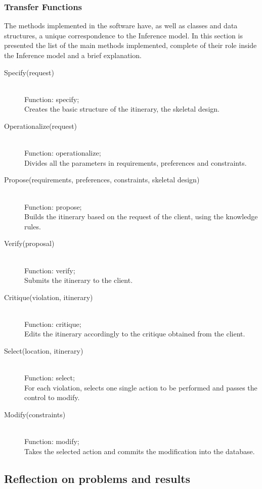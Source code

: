 \documentclass[11pt]{article} %
\begin{document}
\subsubsection{Transfer Functions}
The methods implemented in the software have, as well as classes and data structures, a unique correspondence to the Inference model. In this section is presented the list of the main methods implemented, complete of their role inside the Inference model and a brief explanation.
\begin{description}
\item[Specify(request)] \hfill \\
Function: specify;\\
Creates the basic structure of the itinerary, the skeletal design.
\item[Operationalize(request)] \hfill \\
Function: operationalize;\\
Divides all the parameters in requirements, preferences and constraints.
\item[Propose(requirements, preferences, constraints, skeletal design)] \hfill \\
Function: propose;\\
Builds the itinerary based on the request of the client, using the knowledge rules.
\item[Verify(proposal)] \hfill \\
Function: verify; \\
Submits the itinerary to the client.
\item[Critique(violation, itinerary)] \hfill \\
Function: critique;\\
Edits the itinerary accordingly to the critique obtained from the client.
\item[Select(location, itinerary)] \hfill \\
Function: select;\\
For each violation, selects one single action to be performed and passes the control to modify.
\item[Modify(constraints)] \hfill \\
Function: modify;\\
Takes the selected action and commits the modification into the database.
\end{description}


\subsection{Reflection on problems and results}
\end{document}
